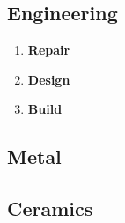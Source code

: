 \subsection{Engineering}\label{subsec:engineering}
\begin{enumerate}[label= -]
    \item \textbf{Repair} 
    \item \textbf{Design} 
    \item \textbf{Build} 
\end{enumerate}
\subsection{Metal}\label{subsec:metal}
\subsection{Ceramics}\label{subsec:ceramics}
